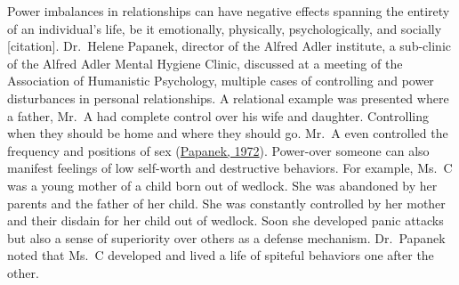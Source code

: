 \documentclass[
  donotrepeattitle,doc, 12pt, a4paper,floatsintext]{apa7}
\begin{document}
Power imbalances in relationships can have negative effects spanning the entirety of an individual's life, be it emotionally, physically, psychologically, and socially {[}citation{]}. Dr.~Helene Papanek, director of the Alfred Adler institute, a sub-clinic of the Alfred Adler Mental Hygiene Clinic, discussed at a meeting of the Association of Humanistic Psychology, multiple cases of controlling and power disturbances in personal relationships. A relational example was presented where a father, Mr.~A had complete control over his wife and daughter. Controlling when they should be home and where they should go. Mr.~A even controlled the frequency and positions of sex (\protect\hyperlink{ref-papanek1972}{Papanek, 1972}). Power-over someone can also manifest feelings of low self-worth and destructive behaviors. For example, Ms.~C was a young mother of a child born out of wedlock. She was abandoned by her parents and the father of her child. She was constantly controlled by her mother and their disdain for her child out of wedlock. Soon she developed panic attacks but also a sense of superiority over others as a defense mechanism. Dr.~Papanek noted that Ms.~C developed and lived a life of spiteful behaviors one after the other.
\end{document}
